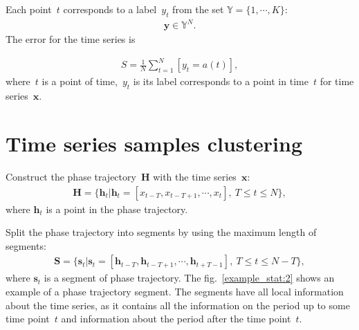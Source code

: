 \documentclass[12pt, twoside]{article}
\numberwithin{equation}{section}
\begin{document}
Each point~$t$ corresponds to a label~$y_t$ from the set $\mathbb{Y} =  \{1,\cdots,K\}$:
\begin{equation}
\label{eq:st:6}
\begin{aligned}
\textbf{y} \in \mathbb{Y}^{N}.
\end{aligned}
\end{equation}
The error for the time series is

\begin{equation}
\label{eq:st:7}
\begin{aligned}
S = \frac{1}{N}\sum_{t=1}^{N}[y_t = a\left(t\right)],
\end{aligned}
\end{equation}
where~$t$ is a point of time,~$y_t$ is its label corresponds to a point in time~$t$ for time series~$\textbf{x}$.


\section{Time series samples clustering}
Construct the phase trajectory~$\mathbf{H}$ with the time series~$\textbf{x}$:
\begin{equation}
\label{eq:cl:1}
\begin{aligned}
\mathbf{H} = \{\textbf{h}_t| \textbf{h}_t = [x_{t-T}, x_{t-T+1}, \cdots, x_{t}],~T\leq t\leq N\},
\end{aligned}
\end{equation}
where $\textbf{h}_t$ is a point in the phase trajectory.

Split the phase trajectory into segments by using the maximum length of segments:
\begin{equation}
\label{eq:cl:2}
\begin{aligned}
\mathbf{S} = \{\textbf{s}_t| \textbf{s}_t = [\textbf{h}_{t-T}, \textbf{h}_{t-T+1}, \cdots, \textbf{h}_{t+T-1}],~T\leq t\leq N-T\},
\end{aligned}
\end{equation}
where $\textbf{s}_t$ is a segment of phase trajectory. The fig.~\ref{example_stat:2} shows an example of a phase trajectory segment. The segments have all local information about the time series, as it contains all the information on the period up to some time point~$t$ and information about the period after the time point~$t$.
\end{document}

